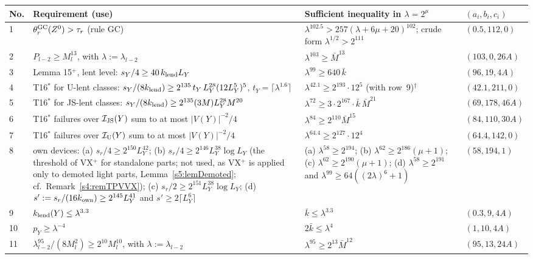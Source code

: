 \begin{table}[htbp]
\begin{center}
\small
\begin{tabular}{|p{0.55cm}|p{4.6cm}|p{5.7cm}|p{2.4cm}|}
\hline
No. & Requirement (use) & Sufficient inequality in $\lambda=2^\mu$ & $(a_i,b_i,c_i)$\\\hline
1 & $\theta^{\mathrm{GC}}_r(Z^0)>\tau_r$ (rule GC) & $\lambda^{102.5}>257(\lambda+6\mu+20)^{102}$; crude form $\lambda^{1/2}>2^{111}$ & $(0.5,112,0)$\\\hline
2 & $P_{l-2}\ge M_l^{13}$, with $\lambda:=\lambda_{l-2}$ & $\lambda^{103}\ge\bar M^{13}$ & $(103,0,26A)$\\\hline
3 & Lemma 15$^+$, lent level: $s_Y/4\ge40\,k_{\mathrm{lend}} L_Y$ & $\lambda^{99}\ge640\,\bar k$ & $(96,19,4A)$\\\hline
4 & T16$^*$ for U-lent classes: $s_Y/(8k_{\mathrm{lend}})\ge2^{135}\,t_Y\,L_Y^{28}(12L_Y^5)^5$, $t_Y=\lceil\lambda^{1.6}\rceil$ & $\lambda^{42.1}\ge2^{193}\cdot12^5$ (with row~9)$^{\dagger}$ & $(42.1,211,0)$\\\hline
5 & T16$^*$ for JS-lent classes: $s_Y/(8k_{\mathrm{lend}})\ge2^{135}(3M)L_Y^{28}M^{20}$ & $\lambda^{72}\ge3\cdot2^{167}\cdot\bar k\,\bar M^{21}$ & $(69,178,46A)$\\\hline
6 & T16$^*$ failures over $\mathcal{I}_{\mathrm{JS}}(Y)$ sum to at most $|V(Y)|^{-2}/4$ & $\lambda^{84}\ge2^{110}\bar M^{15}$ & $(84,110,30A)$\\\hline
7 & T16$^*$ failures over $\mathcal{I}_{\mathrm{U}}(Y)$ sum to at most $|V(Y)|^{-2}/4$ & $\lambda^{64.4}\ge2^{127}\cdot12^4$ & $(64.4,142,0)$\\\hline
8 & own devices: (a) $s_r/4\ge2^{150}L_Y^{42}$; (b) $s_r/4\ge2^{146}L_Y^{38}\log L_Y$ (the threshold of VX$^+$ for standalone parts; not used, as VX$^+$ is applied only to demoted light parts, Lemma~\ref{s5:lemDemoted}; cf.\ Remark~\ref{s4:remTPVVX}); (c) $s_r/2\ge2^{151}L_Y^{38}\log L_Y$; (d) $s':=s_r/(16k_{\mathrm{own}})\ge2^{145}L_Y^{41}$ and $s'\ge2\lceil L_Y^6\rceil$ & (a) $\lambda^{58}\ge2^{194}$; (b) $\lambda^{62}\ge2^{186}(\mu+1)$; (c) $\lambda^{62}\ge2^{190}(\mu+1)$; (d) $\lambda^{58}\ge2^{191}$ and $\lambda^{99}\ge64((2\lambda)^6+1)$ & $(58,194,1)$\\\hline
9 & $k_{\mathrm{lend}}(Y)\le\lambda^{3.3}$ & $\bar k\le\lambda^{3.3}$ & $(0.3,9,4A)$\\\hline
10 & $p_Y\ge\lambda^{-4}$ & $2\bar k\le\lambda^{4}$ & $(1,10,4A)$\\\hline
11 & $\lambda_{l-2}^{95}/(8M_l^2)\ge2^{10}M_l^{10}$, with $\lambda:=\lambda_{l-2}$ & $\lambda^{95}\ge2^{13}\bar M^{12}$ & $(95,13,24A)$\\\hline

\end{tabular}
\end{center}
\end{table}
